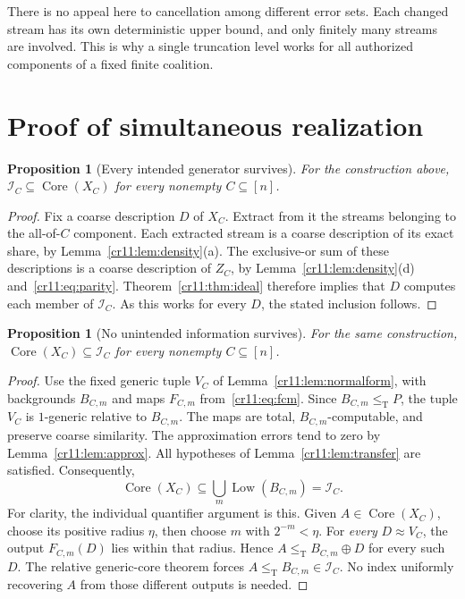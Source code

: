 \documentclass[11pt,letterpaper]{article}
\theoremstyle{plain}
\newtheorem{proposition}[theorem]{Proposition}
\theoremstyle{definition}
\theoremstyle{remark}
\numberwithin{equation}{section}
\newcommand{\leT}{\leq_{\mathrm T}}
\newcommand{\Core}{\operatorname{Core}}
\newcommand{\Low}{\operatorname{Low}}
\newcommand{\join}{\mathbin{\oplus}}
\newcommand{\I}{\mathcal I}
\begin{document}
There is no appeal here to cancellation among different error sets. Each
changed stream has its own deterministic upper bound, and only finitely
many streams are involved. This is why a single truncation level works for
all authorized components of a fixed finite coalition.

\section{Proof of simultaneous realization}\label{cr11:sec:realization}

\begin{proposition}[Every intended generator survives]\label{cr11:prop:lower}
For the construction above, $\I_C\subseteq\Core(X_C)$ for every nonempty
$C\subseteq[n]$.
\end{proposition}
\begin{proof}
Fix a coarse description $D$ of $X_C$. Extract from it the streams belonging
to the all-of-$C$ component. Each extracted stream is a coarse description
of its exact share, by Lemma~\ref{cr11:lem:density}(a). The exclusive-or sum of
these descriptions is a coarse description of $Z_C$, by
Lemma~\ref{cr11:lem:density}(d) and~\eqref{cr11:eq:parity}. Theorem~\ref{cr11:thm:ideal}
therefore implies that $D$ computes each member of $\I_C$. As this works
for every $D$, the stated inclusion follows.
\end{proof}

\begin{proposition}[No unintended information survives]\label{cr11:prop:upper}
For the same construction, $\Core(X_C)\subseteq\I_C$ for every nonempty
$C\subseteq[n]$.
\end{proposition}
\begin{proof}
Use the fixed generic tuple $V_C$ of Lemma~\ref{cr11:lem:normalform}, with
backgrounds $B_{C,m}$ and maps $F_{C,m}$ from~\eqref{cr11:eq:fcm}. Since
$B_{C,m}\leT P$, the tuple $V_C$ is $1$-generic relative to $B_{C,m}$.
The maps are total, $B_{C,m}$-computable, and preserve coarse similarity.
The approximation errors tend to zero by Lemma~\ref{cr11:lem:approx}.
All hypotheses of Lemma~\ref{cr11:lem:transfer} are satisfied. Consequently,
\[
 \Core(X_C)\subseteq\bigcup_m\Low(B_{C,m})=\I_C.
\]
For clarity, the individual quantifier argument is this. Given
$A\in\Core(X_C)$, choose its positive radius $\eta$, then choose $m$ with
$2^{-m}<\eta$. For \emph{every} $D\approx V_C$, the output $F_{C,m}(D)$
lies within that radius. Hence $A\leT B_{C,m}\join D$ for every such $D$.
The relative generic-core theorem forces $A\leT B_{C,m}\in\I_C$.
No index uniformly recovering $A$ from those different outputs is needed.
\end{proof}
\end{document}
